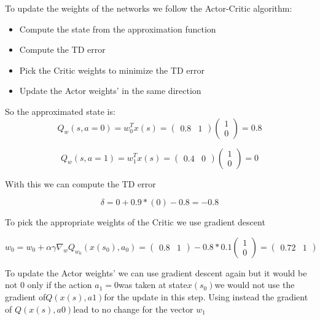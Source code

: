 \documentclass[10pt,a4paper]{article}
\begin{document}
To update the weights of the networks we follow the Actor-Critic algorithm:
\begin{itemize}
    \item Compute the state from the approximation function
    \item Compute the TD error
    \item Pick the Critic weights to minimize the TD error 
    \item Update the Actor weights' in the same direction 
\end{itemize}

So the approximated state is:
\begin{equation*}
    Q_w(s, a = 0) = w_0^Tx(s) = \begin{pmatrix} 0.8 & 1 \end{pmatrix} \begin{pmatrix} 1 \\ 0 \end{pmatrix} = 0.8
\end{equation*}

\begin{equation*}
    Q_w(s, a = 1) = w_1^Tx(s) = \begin{pmatrix} 0.4 & 0 \end{pmatrix} \begin{pmatrix} 1 \\ 0 \end{pmatrix} = 0
\end{equation*}

With this we can compute the TD error

\begin{equation*}
    \delta = 0 + 0.9*(0) - 0.8 = -0.8
\end{equation*}

To pick the appropriate weights of the Critic we use gradient descent  

\begin{equation*}
w_0 = w_0 + \alpha\gamma \nabla_w Q_{w_0} (x(s_0), a_0) = \begin{pmatrix} 0.8 & 1 \end{pmatrix} -0.8 * 0.1 \begin{pmatrix} 1 \\ 0 \end{pmatrix} = \begin{pmatrix} 0.72 & 1 \end{pmatrix}
\end{equation*}

To update the Actor weights' we can use gradient descent again but it would be not 0 only if the action $a_1 = 0 $was taken at state$ x(s_0) $we would not use the gradient of$ Q(x(s), a1) $for the update in this step. Using
instead the gradient of $Q(x(s), a0) $lead to no change for the vector $w_1$
\end{document}
